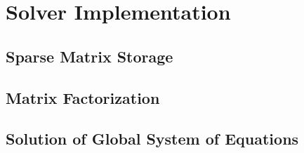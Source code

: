 \documentclass[../Dissertation]{subfiles}
\begin{document}
\section{Solver Implementation}\label{s:Solver}
    \lipsum[1-5]
    \subsection{Sparse Matrix Storage}			\label{subsec4_4:SparseStorage}
    \lipsum[1]
    \subsection{Matrix Factorization}			\label{subsec4_4:MatrixFac}
    \lipsum[1]
    \subsection{Solution of Global System of Equations}	\label{subsec4_4:SolGlobSysEq}
  
\end{document}
